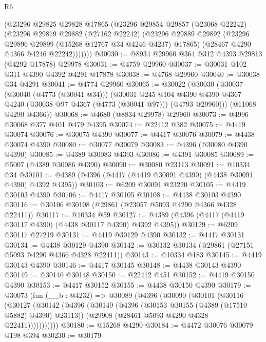 \begin{lexlean}{R6}
\begin{coremodule}
        (@23296
          @29825
          @29828
          @17865
          (@23296
            @29854
            @29857
            (@23068 @22242)
            (@23296
              @29879
              @29882
              (@27162 @22242)
              (@23296
                @29889
                @29892
                (@23296 @29896 @29899 (@15268 @12767 @34 @4246 @4237) @17865)
                (@28467 @4290 @4366 @4246 @22242)))))))
@30030 := @8934 @29960 @364 @312 @4393 @29813 (@4292 @17878) @29978
@30031 := @4759 @29960
@30037 := @30031 @102 @311 @4390 @4392 @4291 @17878
@30038 := @4768 @29960
@30040 := @30038 @34 @4291
@30041 := @4774 @29960
@30065 := @30022
    (@30030
      (@30037
        (@30040 (@4773 (@30041 @34)))
        (@30031
          @245
          @104
          @4390
          @4390
          @4367
          @4240
          (@30038 @97 @4367 (@4773 (@30041 @97)))
          (@4793 @29960)))
      (@11068 @4290 @4366))
@30068 := @4680 (@8834 @29978) @29960
@30073 := @4996 @30068 @377 @401 @479 @4395
@30074 := @22412 @382
@30075 := @4419 @30074
@30076 := @30075 @4390
@30077 := @4417 @30076
@30079 := @4438 @30074 @4390
@30080 := @30077 @30079
@30083 := @4396 (@30080 @4390 @4390)
@30085 := @4389 @30083 @4393
@30086 := @4391 @30085
@30089 := @5007 (@4389 @30086 @4390)
@30090 := @30080 @23113
@30091 := @10334 @34
@30101 := @4389 (@4396 (@4417 (@4419 @30091 @4390) (@4438 @30091 @4390) @4392 @4395))
@30103 := @6209 @30091 @23220
@30105 := @4419 @30103 @4390
@30106 := @4417 @30105
@30108 := @4438 @30103 @4390
@30116 := @30106 @30108 (@29861 (@23057 @5093 @4290 @4366 @4328 @22411))
@30117 := @10334 @59
@30127 := @4389 (@4396 (@4417 (@4419 @30117 @4390) (@4438 @30117 @4390) @4392 @4395))
@30129 := @6209 @30117 @27219
@30131 := @4419 @30129 @4390
@30132 := @4417 @30131
@30134 := @4438 @30129 @4390
@30142 := @30132 @30134 (@29861 (@27151 @5093 @4290 @4366 @4328 @22411))
@30143 := @10334 @183
@30145 := @4419 @30143 @4390
@30146 := @4417 @30145
@30148 := @4438 @30143 @4390
@30149 := @30146 @30148
@30150 := @22412 @451
@30152 := @4419 @30150 @4390
@30153 := @4417 @30152
@30155 := @4438 @30150 @4390
@30179 := @30073
    (fun (__b : @4232) =>
    @30089
      (@4396
        (@30090
          (@30101
            (@30116
              (@30127
                (@30142
                  (@4396
                    (@30149
                      (@4396 (@30153 @30155 (@4389 (@17510 @5882) @4390) @23113))
                      (@29908 (@28461 @5093 @4290 @4328 @22411)))))))))))
@30180 := @15268 @4290
@30184 := @4472 @30076 @30079 @198 @394
@30230 := @30179

\end{coremodule}
\end{lexlean}

